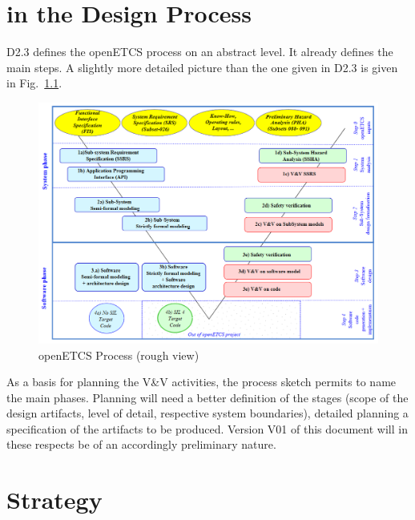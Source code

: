 \documentclass{template/openetcs_report}
\begin{document}
\chapter{\VV in the Design Process}
\label{cha:vv-design-process}

D2.3 defines the openETCS process on an abstract level. It already
defines the main steps. A slightly more detailed picture than the one
given in D2.3 is given in Fig.~\ref{fig:openETCSProcess}. 

\begin{figure}[htb]
  \centering
  \includegraphics[width=.9\textwidth]{images/ProcessOpenETCS-BeM.png}
  \caption{openETCS Process (rough view)}
  \label{fig:openETCSProcess}
\end{figure}
%
As a basis for planning the V\&V activities, the process sketch
permits to name the main phases. Planning will need a
better definition of the stages (scope of the design artifacts,
level of detail, respective system boundaries), detailed planning a
specification of the artifacts to be produced. Version V01 of this
document will in these respects be of an accordingly preliminary
nature. 
 

\chapter{\VV Strategy}
\end{document}
